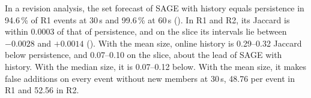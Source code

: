 In a revision analysis, the set forecast of SAGE with history equals persistence in 94.6\,\% of R1 events at 30\,s and 99.6\,\% at 60\,s ().
In R1 and R2, its Jaccard is within 0.0003 of that of persistence, and on the slice its intervals lie between $-0.0028$ and $+0.0014$ ().
With the mean size, online history is 0.29--0.32 Jaccard below persistence, and 0.07--0.10 on the slice, about the lead of SAGE with history.
With the median size, it is 0.07--0.12 below.
With the mean size, it makes false additions on every event without new members at 30\,s, 48.76 per event in R1 and 52.56 in R2.
